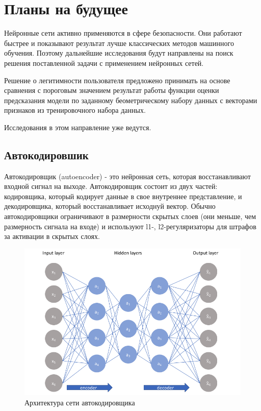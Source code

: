 \documentclass[12pt]{article}
\begin{document}
    \section{Планы на будущее}
    \label{sec:Future}

    \par Нейронные сети активно применяются в сфере безопасности. Они работают быстрее и показывают результат лучше классических методов машинного обучения. Поэтому дальнейшие исследования будут направлены на поиск решения поставленной задачи с применением нейронных сетей.

    \par Решение о легитимности пользователя предложено принимать на основе сравнения с пороговым значением результат работы функции оценки предсказания модели по заданному беометрическому набору данных с векторами признаков из тренировочного набора данных.

    \par Исследования в этом направление уже ведутся.


    \subsection{Автокодировшик}
    \label{sec:Future:Autoencoder}
    
    \par Автокодировщик (autoencoder) \cite{autoencoder} - это нейронная сеть, которая восстанавливают входной сигнал на выходе. Автокодировщик состоит из двух частей: кодировщика, который кодирует данные в свое внутреннее представление, и декодировщика, который восстанавливает исходнуй вектор. Обычно автокодировщики ограничивают в размерности скрытых слоев (они меньше, чем размерность сигнала на входе) и используют l1-, l2-регуляризаторы для штрафов за активации в скрытых слоях.

    \begin{figure}[h!]
        \centering
        \includegraphics[width=0.9\linewidth]{autoencoder.png}
        \caption{Архитектура сети автокодировщика}
        \label{sec:Future:autoencoder:fig:autoencoder}
    \end{figure}
\end{document}

